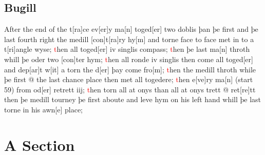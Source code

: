 \documentclass[12pt,letter]{article} %
\newcommand{\red}[1]{\textcolor{red}{#1}}
\newcommand{\srcpg}[1]{(start #1)}
\begin{document}
\subsection{Bugill}
After the end of the t{[}ra{]}ce ev{[}er{]}y ma{[}n{]} toged{[}er{]} two
doblis þan þe first and þe last fourth right the medill
{[}con{]}t{[}ra{]}ry hy{[}m{]} and torne face to face met in to a
t{[}ri{]}angle wyse; \red{t}hen all toged{[}er{]} iv singlis compass; \red{t}hen þe
last ma{[}n{]} throth whill þe oder two {[}con{]}ter hym; \red{t}hen all ronde
iv singlis then come all toged{[}er{]} and dep{[}ar{]}t w{[}it{]} a torn
the d{[}er{]} þay come fro{[}m{]}; \red{t}hen the medill throth while þe first
@ the last chance place then met all togedere; \red{t}hen e{[}ve{]}ry
ma{[}n{]} \srcpg{59} from od{[}er{]} retrett iij; \red{t}hen torn all at onys
than all at onys trett @ ret{[}re{]}tt then þe medill tourney þe first
aboute and leve hym on his left hand whill þe last torne in his
awn{[}e{]} place;

\newpage

    \section{A Section}
    \lipsum[1]
    
    \nocite{*}
    
    
\end{document}
